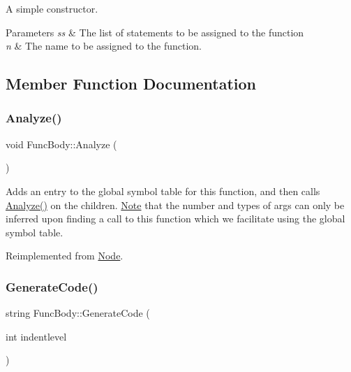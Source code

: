 A simple constructor. 
\begin{DoxyParams}{Parameters}
{\em ss} & The list of statements to be assigned to the function \\
\hline
{\em n} & The name to be assigned to the function. \\
\hline
\end{DoxyParams}


\subsection{Member Function Documentation}
\mbox{\label{class_func_body_a6114d98f4cd6e0341cb8662750266477}} 
\subsubsection{\texorpdfstring{Analyze()}{Analyze()}}
{\footnotesize\ttfamily void Func\+Body\+::\+Analyze (\begin{DoxyParamCaption}{ }\end{DoxyParamCaption})\hspace{0.3cm}{\ttfamily [virtual]}}

Adds an entry to the global symbol table for this function, and then calls \hyperlink{class_func_body_a6114d98f4cd6e0341cb8662750266477}{Analyze()} on the children. \hyperlink{class_note}{Note} that the number and types of args can only be inferred upon finding a call to this function which we facilitate using the global symbol table. 

Reimplemented from \hyperlink{class_node_a5f88d55c6f253a29def7ccc443d83d47}{Node}.

\mbox{\label{class_func_body_ade15e61124358e79682a8a78dd92f064}} 
\subsubsection{\texorpdfstring{Generate\+Code()}{GenerateCode()}}
{\footnotesize\ttfamily string Func\+Body\+::\+Generate\+Code (\begin{DoxyParamCaption}\item[{int}]{indentlevel }\end{DoxyParamCaption})\hspace{0.3cm}{\ttfamily [virtual]}}

